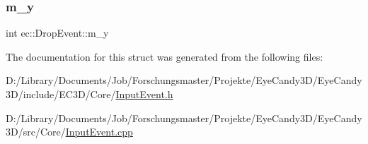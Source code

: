 \mbox{\label{structec_1_1_drop_event_a59338dd4b8cd47b7f025908a63be2e92}} 
\subsubsection{\texorpdfstring{m\+\_\+y}{m\_y}}
{\footnotesize\ttfamily int ec\+::\+Drop\+Event\+::m\+\_\+y}



The documentation for this struct was generated from the following files\+:\begin{DoxyCompactItemize}
\item 
D\+:/\+Library/\+Documents/\+Job/\+Forschungsmaster/\+Projekte/\+Eye\+Candy3\+D/\+Eye\+Candy3\+D/include/\+E\+C3\+D/\+Core/\mbox{\hyperlink{_input_event_8h}{Input\+Event.\+h}}\item 
D\+:/\+Library/\+Documents/\+Job/\+Forschungsmaster/\+Projekte/\+Eye\+Candy3\+D/\+Eye\+Candy3\+D/src/\+Core/\mbox{\hyperlink{_input_event_8cpp}{Input\+Event.\+cpp}}\end{DoxyCompactItemize}
